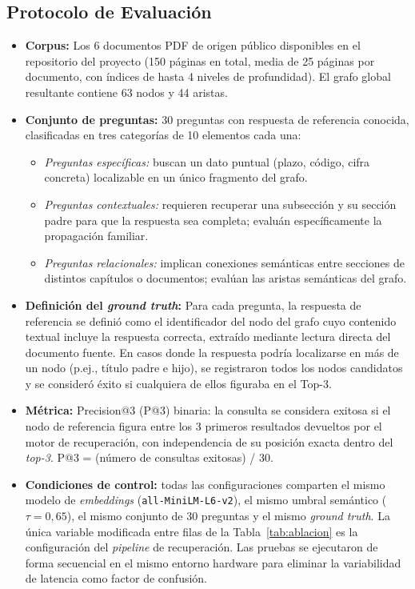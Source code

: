 \subsection{Protocolo de Evaluación}

\begin{itemize}
    \item \textbf{Corpus:} Los 6 documentos PDF de origen público disponibles en el repositorio del proyecto (150 páginas en total, media de 25 páginas por documento, con índices de hasta 4 niveles de profundidad). El grafo global resultante contiene 63 nodos y 44 aristas.

    \item \textbf{Conjunto de preguntas:} 30 preguntas con respuesta de referencia conocida, clasificadas en tres categorías de 10 elementos cada una:
    \begin{itemize}
        \item \textit{Preguntas específicas:} buscan un dato puntual (plazo, código, cifra concreta) localizable en un único fragmento del grafo.
        \item \textit{Preguntas contextuales:} requieren recuperar una subsección y su sección padre para que la respuesta sea completa; evaluán específicamente la propagación familiar.
        \item \textit{Preguntas relacionales:} implican conexiones semánticas entre secciones de distintos capítulos o documentos; evalúan las aristas semánticas del grafo.
    \end{itemize}

    \item \textbf{Definición del \textit{ground truth}:} Para cada pregunta, la respuesta de referencia se definió como el identificador del nodo del grafo cuyo contenido textual incluye la respuesta correcta, extraído mediante lectura directa del documento fuente. En casos donde la respuesta podría localizarse en más de un nodo (p.ej., título padre e hijo), se registraron todos los nodos candidatos y se consideró éxito si cualquiera de ellos figuraba en el Top-3.

    \item \textbf{Métrica:} Precision@3 (P@3) binaria: la consulta se considera exitosa si el nodo de referencia figura entre los 3 primeros resultados devueltos por el motor de recuperación, con independencia de su posición exacta dentro del \textit{top-3}. P@3 = (número de consultas exitosas) / 30.

    \item \textbf{Condiciones de control:} todas las configuraciones comparten el mismo modelo de \textit{embeddings} (\texttt{all-MiniLM-L6-v2}), el mismo umbral semántico ($\tau = 0{,}65$), el mismo conjunto de 30 preguntas y el mismo \textit{ground truth}. La única variable modificada entre filas de la Tabla~\ref{tab:ablacion} es la configuración del \textit{pipeline} de recuperación. Las pruebas se ejecutaron de forma secuencial en el mismo entorno hardware para eliminar la variabilidad de latencia como factor de confusión.
\end{itemize}

